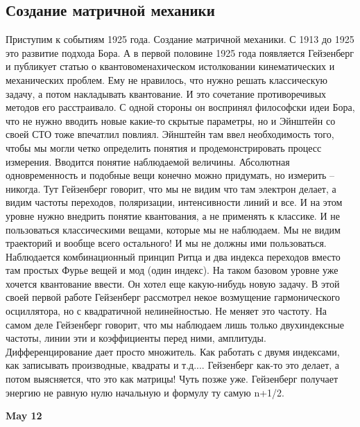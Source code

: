 \documentclass[a4paper, 12pt]{article}
\begin{document}
\subsection{Создание матричной механики}

Приступим к событиям 1925 года. Создание матричной механики. С 1913 до 
1925 это развитие подхода Бора. А в первой половине 1925 года появляется 
Гейзенберг и публикует статью о квантовоменахическом истолковании 
кинематических и механических проблем. Ему не нравилось, что нужно 
решать классическую задачу, а потом накладывать квантование. И это 
сочетание противоречивых методов его расстраивало. С одной стороны он 
воспринял философски идеи Бора, что не нужно вводить новые какие-то 
скрытые параметры, но и Эйнштейн со своей СТО тоже впечатлил повлиял. 
Эйнштейн там ввел необходимость того, чтобы мы могли четко определить 
понятия и продемонстрировать процесс измерения. Вводится понятие 
наблюдаемой величины. Абсолютная одновременность и подобные вещи конечно 
можно придумать, но измерить -- никогда. Тут Гейзенберг говорит, что мы 
не видим что там электрон делает, а видим частоты переходов, 
поляризации, интенсивности линий и все. И на этом уровне нужно внедрить 
понятие квантования, а не применять к классике. И не пользоваться 
классическими вещами, которые мы не наблюдаем. Мы не видим траекторий 
и вообще всего остального! И мы не должны ими пользоваться. Наблюдается 
комбинационный принцип Ритца и два индекса переходов вместо там простых 
Фурье вещей и мод (один индекс). На таком базовом уровне уже хочется 
квантование ввести. Он хотел еще какую-нибудь новую задачу. В этой своей 
первой работе Гейзенберг рассмотрел некое возмущение гармонического 
осциллятора, но с квадратичной нелинейностью. Не меняет это частоту. На 
самом деле Гейзенберг говорит, что мы наблюдаем лишь только 
двухиндексные частоты, линии эти и коэффициенты перед ними, амплитуды. 
Дифференцирование дает просто множитель. Как работать с двумя индексами, 
как записывать производные, квадраты и т.д.... Гейзенберг как-то это 
делает, а потом выясняется, что это как матрицы! Чуть позже уже. 
Гейзенберг получает энергию не равную нулю начальную и формулу ту самую 
n+1/2.

\hfill\textbf{May 12}
\end{document}
